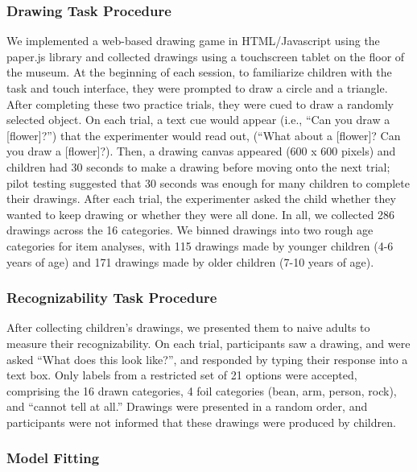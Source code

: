 \documentclass[10pt, letterpaper]{article}
\begin{document}
\subsubsection{Drawing Task Procedure}\label{drawing-task-procedure}

We implemented a web-based drawing game in HTML/Javascript using the
paper.js library and collected drawings using a touchscreen tablet on
the floor of the museum. At the beginning of each session, to
familiarize children with the task and touch interface, they were
prompted to draw a circle and a triangle. After completing these two
practice trials, they were cued to draw a randomly selected object. On
each trial, a text cue would appear (i.e., ``Can you draw a
{[}flower{]}?'') that the experimenter would read out, (``What about a
{[}flower{]}? Can you draw a {[}flower{]}?). Then, a drawing canvas
appeared (600 x 600 pixels) and children had 30 seconds to make a
drawing before moving onto the next trial; pilot testing suggested that
30 seconds was enough for many children to complete their drawings.
After each trial, the experimenter asked the child whether they wanted
to keep drawing or whether they were all done. In all, we collected 286
drawings across the 16 categories. We binned drawings into two rough age
categories for item analyses, with 115 drawings made by younger children
(4-6 years of age) and 171 drawings made by older children (7-10 years
of age).

\subsubsection{Recognizability Task
Procedure}\label{recognizability-task-procedure}

After collecting children's drawings, we presented them to naive adults
to measure their recognizability. On each trial, participants saw a
drawing, and were asked ``What does this look like?'', and responded by
typing their response into a text box. Only labels from a restricted set
of 21 options were accepted, comprising the 16 drawn categories, 4 foil
categories (bean, arm, person, rock), and ``cannot tell at all.''
Drawings were presented in a random order, and participants were not
informed that these drawings were produced by children.

\subsubsection{Model Fitting}\label{model-fitting}
\end{document}
